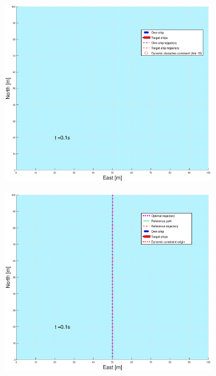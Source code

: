 \begin{figure}[!b] %
    \begin{subfigure}[b]{0.49\textwidth}
        \centering
        \includegraphics[width=\textwidth]{Images/Figures/enkel_SO/_Simple_1fig1_time=0}
    \end{subfigure}
    \hfill
    \begin{subfigure}[b]{0.499\textwidth}
        \centering
        \includegraphics[width=\textwidth]{Images/Figures/enkel_SO/_Simple_1fig999_time=0}

\end{subfigure}
\end{figure}
